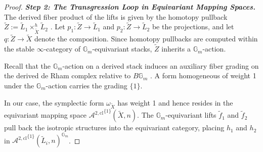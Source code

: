 \documentclass[reqno]{amsart}
\theoremstyle{definition}
\theoremstyle{remark}
\newcommand{\Gm}{\mathbb{G}_m}
\newcommand{\Acl}{\mathcal{A}^{2, \mathrm{cl}}}
\begin{document}
{\begin{proof}




\vspace{5pt}


\textbf{\textit{Step 2: The Transgression Loop in Equivariant Mapping Spaces.}}
  The derived fiber product of the lifts is given by the homotopy pullback $\widetilde{Z} := \widetilde{L}_1 \times_{\widetilde{X}}^h \widetilde{L}_2$ \cite[Section 2.2.2]{HAG-II}. Let $p_1 \colon \widetilde{Z} \to \widetilde{L}_1$ and $p_2 \colon \widetilde{Z} \to \widetilde{L}_2$ be the projections, and let $q \colon \widetilde{Z} \to \widetilde{X}$ denote the composition. Since homotopy pullbacks are computed within the stable $\infty$-category of $\Gm$-equivariant stacks, $\widetilde{Z}$ inherits a $\Gm$-action.

  Recall that the $\Gm$-action on a derived stack induces an auxiliary fiber grading on the derived de Rham complex relative to $B\Gm$ \cite[Section 2.1.1]{Calaque}. A form homogeneous of weight 1 under the $\Gm$-action carries the grading $\{1\}$. 
  
  In our case, the symplectic form $\omega_{\widetilde{X}}$ has weight 1 and hence resides in the equivariant mapping space ${\Acl}^{\{1\}}(\widetilde{X}, n)$. The $\Gm$-equivariant lifts $\widetilde{f}_1$ and $\widetilde{f}_2$ pull back the isotropic structures into the equivariant category, placing $h_1$ and $h_2$ in ${\Acl}^{\{1\}}(\widetilde{L}_i, n)^{\Gm}$.


\end{proof}}
\end{document}
